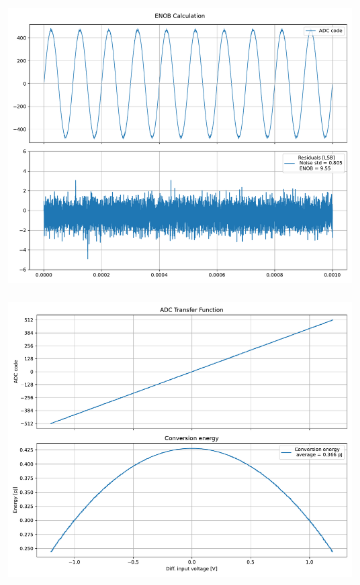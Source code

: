 \documentclass[varwidth]{standalone}
\begin{document}
\begin{figure}
\begin{subfigure}{0.32\textwidth}
    \includegraphics[width=\textwidth]{behavioral_10b_seterror_enob.pdf}
\end{subfigure}
\begin{subfigure}{0.32\textwidth}
    \begin{table}
    \let\center\empty
    \let\endcenter\relax
    \centering
    \resizebox{0.3\width}{!}{}
    \end{table}
    \includegraphics[width=\textwidth]{behavioral_10b_seterror_energy.pdf}
\end{subfigure}
\end{figure}
\end{document}
